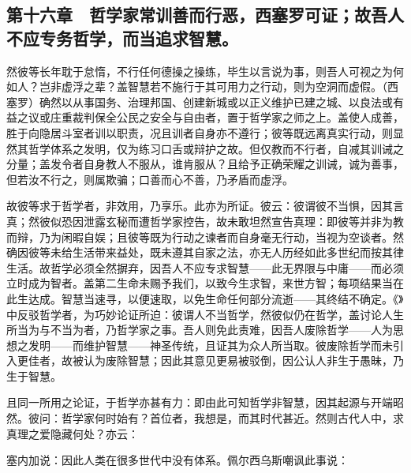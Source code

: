 \subsection{第十六章　哲学家常训善而行恶，西塞罗可证；故吾人不应专务哲学，而当追求智慧。}

然彼等长年耽于怠惰，不行任何德操之操练，毕生以言说为事，则吾人可视之为何如人？岂非虚浮之辈？盖智慧若不施行于其可用力之行动，则为空洞而虚假。（西塞罗）确然以从事国务、治理邦国、创建新城或以正义维护已建之城、以良法或有益之议或庄重裁判保全公民之安全与自由者，置于哲学家之师之上。盖使人成善，胜于向隐居斗室者训以职责，况且训者自身亦不遵行；彼等既远离真实行动，则显然其哲学体系之发明，仅为练习口舌或辩护之故。但仅教而不行者，自减其训诫之分量；盖发令者自身教人不服从，谁肯服从？且给予正确荣耀之训诫，诚为善事，但若汝不行之，则属欺骗；口善而心不善，乃矛盾而虚浮。\par

故彼等求于哲学者，非效用，乃享乐。此亦为所证。彼云：彼谓彼不当惧，因其言真；然彼似恐因泄露玄秘而遭哲学家控告，故未敢坦然宣告真理：即彼等并非为教而辩，乃为闲暇自娱；且彼等既为行动之谏者而自身毫无行动，当视为空谈者。然确因彼等未给生活带来益处，既未遵其自家之法，亦无人历经如此多世纪而按其律生活。故哲学必须全然摒弃，因吾人不应专求智慧——此无界限与中庸——而必须立时成为智者。盖第二生命未赐予我们，以致今生求智，来世方智；每项结果当在此生达成。智慧当速寻，以便速取，以免生命任何部分流逝——其终结不确定。《》中反驳哲学者，为巧妙论证所迫：彼谓人不当哲学，然彼似仍在哲学，盖讨论人生所当为与不当为者，乃哲学家之事。吾人则免此责难，因吾人废除哲学——人为思想之发明——而维护智慧——神圣传统，且证其为众人所当取。彼废除哲学而未引入更佳者，故被认为废除智慧；因此其意见更易被驳倒，因公认人非生于愚昧，乃生于智慧。\par

且同一所用之论证，于哲学亦甚有力：即由此可知哲学非智慧，因其起源与开端昭然。彼问：哲学家何时始有？首位者，我想是，而其时代甚近。然则古代人中，求真理之爱隐藏何处？亦云：\par

\par

塞内加说：因此人类在很多世代中没有体系。佩尔西乌斯嘲讽此事说：\newline{}\par

